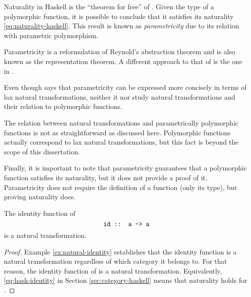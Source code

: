Naturality in Haskell is the ``theorem for free'' of
\parencite{wadler-1989}. Given the type of a polymorphic function, it
is possible to conclude that it satisfies its naturality
\eqref{eq:naturality-haskell}. This result is known as
\emph{parametricity} due to its relation with parametric polymorphism.

Parametricity is a reformulation of Reynold's abstraction theorem and
is also known as the representation theorem. A different approach to
that of \parencite{wadler-1989} is the one in \parencite{abadi-1993}.

Even though \parencite[page 350]{wadler-1989} says that parametricity
can be expressed more concisely in terms of lax natural
transformations, neither it nor \parencite{abadi-1993} study natural
transformations and their relation to polymorphic functions.

The relation between natural transformations and parametrically
polymorphic functions is not as straightforward as discussed here.
Polymorphic functions actually correspond to lax natural
transformations, but this fact is beyond the scope of this
dissertation.

Finally, it is important to note that parametricity guarantees that a
polymorphic function satisfies its naturality, but it does not provide
a proof of it. Parametricity does not require the definition of a
function (only its type), but proving naturality does.

\begin{example}
  \label{ex:natural-identity-haskell}

  The identity function of \hask
  \begin{equation*}
    \text{\texttt{id :: a -> a}}
  \end{equation*}
  is a natural transformation.

  \begin{proof}

    Example \ref{ex:natural-identity} establishes that the identity
    function is a natural transformation regardless of which category
    it belongs to. For that reason, the identity function of \hask is
    a natural transformation. Equivalently, \eqref{eq:hask-identity}
    in Section \ref{sec:category-haskell} means that naturality holds
    for .

  \end{proof}

\end{example}

